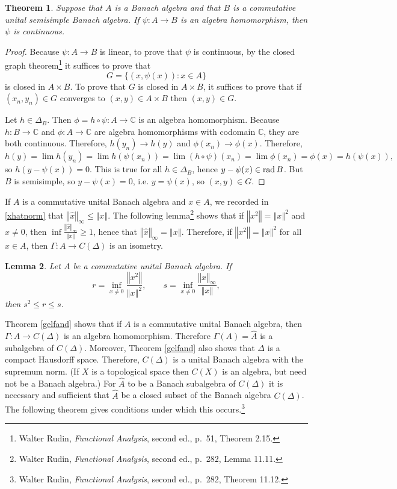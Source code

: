 \documentclass{article}
\newcommand{\rad}{\ensuremath\mathrm{rad}\,}
\newcommand{\norm}[1]{\left\Vert #1 \right\Vert}
\newtheorem{theorem}{Theorem}
\newtheorem{lemma}[theorem]{Lemma}
\theoremstyle{definition}
\begin{document}
\begin{theorem}
Suppose that $A$ is a Banach algebra and that $B$ is a commutative unital semisimple Banach algebra. If $\psi:A \to B$
is an algebra homomorphism, then $\psi$ is continuous.
\end{theorem}
\begin{proof}
Because $\psi:A \to B$ is linear, to prove that $\psi$ is continuous,  by
the closed graph theorem\footnote{Walter Rudin, {\em Functional Analysis}, second ed., p.~51, Theorem 2.15.}
it suffices to prove that
\[
G = \{(x,\psi (x)): x \in A\}
\]
is closed in $A \times B$. To prove that $G$ is closed in $A \times B$, it suffices to prove that
if  $(x_n,y_n) \in G$ converges to $(x,y) \in A \times B$ then $(x,y) \in G$. 

Let $h \in \Delta_B$. Then $\phi = h \circ \psi:A \to \mathbb{C}$ is an algebra homomorphism. Because $h:B \to \mathbb{C}$ and
$\phi:A \to \mathbb{C}$ are algebra homomorphisms with codomain $\mathbb{C}$, they are both continuous. Therefore, 
$h(y_n) \to h(y)$ and $\phi(x_n) \to \phi(x)$. Therefore,
\[
h(y) = \lim h(y_n) = \lim h(\psi(x_n)) = \lim (h \circ \psi)(x_n) = \lim \phi(x_n) = \phi(x) = h(\psi(x)),
\]
so $h(y-\psi(x))=0$. This is true for all $h \in \Delta_B$, hence $y-\psi(x) \in \rad B$. But $B$ is semisimple, so $y-\psi(x)=0$, i.e. 
$y=\psi(x)$, so $(x,y) \in G$.
\end{proof}

If $A$ is a commutative unital Banach algebra and $x \in A$, we recorded in \eqref{xhatnorm} that
$\norm{\hat{x}}_\infty \leq \norm{x}$. The following lemma\footnote{Walter Rudin, {\em Functional Analysis}, second ed.,
p.~282, Lemma 11.11.}  shows that if $\norm{x^2} = \norm{x}^2$ and $x \neq 0$, then
$\inf \frac{\norm{\hat{x}}_\infty}{\norm{x}} \geq 1$, hence that $\norm{\hat{x}}_\infty = \norm{x}$. Therefore, if $\norm{x^2}=\norm{x}^2$ for all $x \in A$,
then $\Gamma:A \to C(\Delta)$ is an isometry.

\begin{lemma}
Let $A$ be a commutative unital Banach algebra. If
\[
r= \inf_{x \neq 0} \frac{\norm{x^2}}{\norm{x}^2}, \qquad s = \inf_{x \neq 0} \frac{\norm{\hat{x}}_\infty}{\norm{x}},
\]
then $s^2 \leq r \leq s$.
\label{normlemma}
\end{lemma}

Theorem \ref{gelfand} shows that if $A$ is a commutative unital Banach algebra, then $\Gamma:A \to C(\Delta)$ is an algebra homomorphism.
Therefore $\Gamma(A)=\widehat{A}$ is a subalgebra of $C(\Delta)$.
Moreover,
Theorem \ref{gelfand} also shows  that $\Delta$ is a compact
Hausdorff space. Therefore, $C(\Delta)$ is  a unital Banach algebra with the supremum norm. (If $X$ is a topological space then $C(X)$ is an algebra, but need not
be a Banach algebra.) For $\widehat{A}$ to be a Banach subalgebra of $C(\Delta)$ it is necessary and sufficient that $\widehat{A}$ be a closed
subset of the Banach algebra $C(\Delta)$. The following theorem gives conditions under which this occurs.\footnote{Walter Rudin, {\em Functional Analysis}, second ed., p.~282, Theorem 11.12.}
\end{document}
